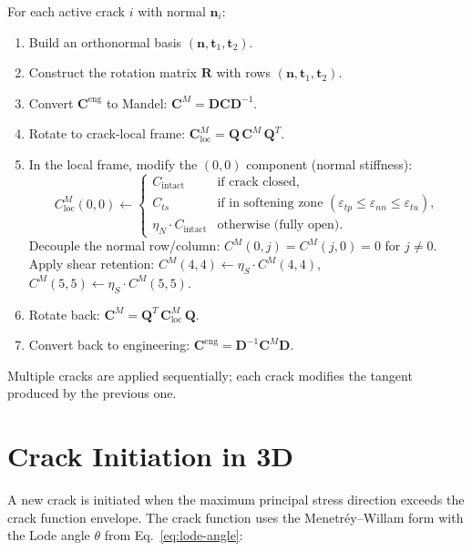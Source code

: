 For each active crack $i$ with normal $\mathbf{n}_i$:
\begin{enumerate}
  \item Build an orthonormal basis $(\mathbf{n}, \mathbf{t}_1, \mathbf{t}_2)$.
  \item Construct the rotation matrix $\mathbf{R}$ with rows
        $(\mathbf{n}, \mathbf{t}_1, \mathbf{t}_2)$.
  \item Convert $\mathbf{C}^{\text{eng}}$ to Mandel:
        $\mathbf{C}^M = \mathbf{D}\mathbf{C}\mathbf{D}^{-1}$.
  \item Rotate to crack-local frame:
        $\mathbf{C}^M_{\text{loc}} = \mathbf{Q}\,\mathbf{C}^M\,\mathbf{Q}^T$.
  \item In the local frame, modify the $(0,0)$ component (normal stiffness):
        \[
          C^M_{\text{loc}}(0,0) \leftarrow
          \begin{cases}
            C_{\text{intact}} & \text{if crack closed}, \\
            C_{ts}           & \text{if in softening zone } (\varepsilon_{tp} \le \varepsilon_{nn} \le \varepsilon_{tu}), \\
            \eta_N \cdot C_{\text{intact}} & \text{otherwise (fully open)}.
          \end{cases}
        \]
        Decouple the normal row/column: $C^M(0,j) = C^M(j,0) = 0$ for $j \neq 0$.
        Apply shear retention: $C^M(4,4) \leftarrow \eta_S \cdot C^M(4,4)$,
        $C^M(5,5) \leftarrow \eta_S \cdot C^M(5,5)$.
  \item Rotate back: $\mathbf{C}^M = \mathbf{Q}^T\,\mathbf{C}^M_{\text{loc}}\,\mathbf{Q}$.
  \item Convert back to engineering: $\mathbf{C}^{\text{eng}} = \mathbf{D}^{-1}\mathbf{C}^M\mathbf{D}$.
\end{enumerate}

Multiple cracks are applied sequentially; each crack modifies the tangent
produced by the previous one.


\section{Crack Initiation in 3D}
\label{sec:kb3d-cracking}

A new crack is initiated when the maximum principal stress direction exceeds
the crack function envelope.  The crack function uses the Menetr\'{e}y--Willam
form with the Lode angle $\theta$ from Eq.~\eqref{eq:lode-angle}:

